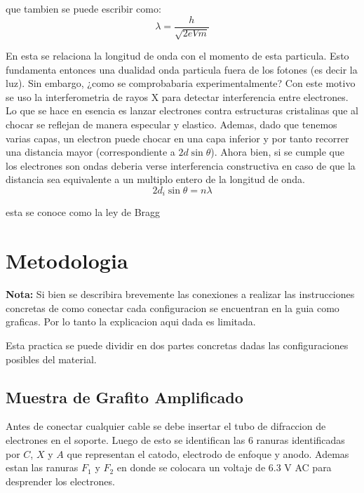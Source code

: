 \documentclass[a4paper, amsfonts, amssymb, amsmath, reprint, showkeys, nofootinbib, twoside]{revtex4-1}
\begin{document}
que tambien se puede escribir como:
\begin{equation}
  \lambda = \frac{h}{\sqrt{2eVm}}
  \label{eq:de-broglie2}
\end{equation}

En esta se relaciona la longitud de onda con el momento de esta particula. Esto fundamenta entonces una dualidad onda particula fuera de los fotones (es decir la luz). Sin embargo, ¿como se comprobabaria experimentalmente? Con este motivo se uso la interferometria de rayos X para detectar interferencia entre electrones. Lo que se hace en esencia es lanzar electrones contra estructuras cristalinas que al chocar se reflejan de manera especular y elastico. Ademas, dado que tenemos varias capas, un electron puede chocar en una capa inferior y por tanto recorrer una distancia mayor (correspondiente a $2d\sin\theta$). Ahora bien, si se cumple que los electrones son ondas deberia verse interferencia constructiva en caso de que la distancia sea equivalente a un multiplo entero de la longitud de onda.
\begin{equation}
  2d_i\sin\theta = n\lambda
  \label{eq:bragg}
\end{equation}

esta se conoce como la ley de Bragg

\section{Metodologia}

\textbf{Nota:} Si bien se describira brevemente las conexiones a realizar las instrucciones concretas de como conectar cada configuracion se encuentran en la guia como graficas. Por lo tanto la explicacion aqui dada es limitada.

Esta practica se puede dividir en dos partes concretas dadas las configuraciones posibles del material.

\subsection{Muestra de Grafito Amplificado}

Antes de conectar cualquier cable se debe insertar el tubo de difraccion de electrones en el soporte. Luego de esto se identifican las 6 ranuras identificadas por $C$, $X$ y $A$ que representan el catodo, electrodo de enfoque y anodo. Ademas estan las ranuras $F_1$ y $F_2$ en donde se colocara un voltaje de 6.3 V AC para desprender los electrones.
\end{document}
